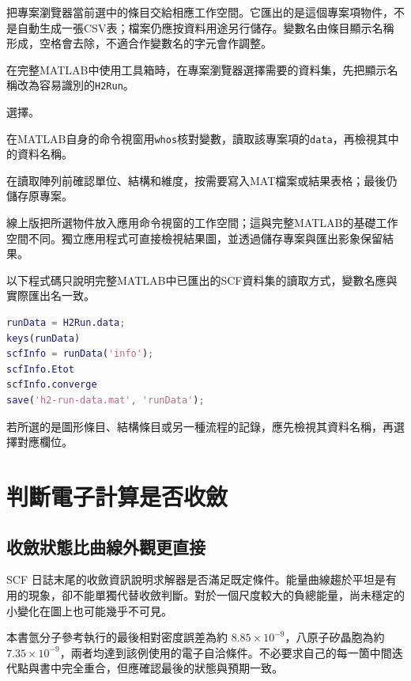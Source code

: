 把專案瀏覽器當前選中的條目交給相應工作空間。它匯出的是這個專案項物件，不是自動生成一張CSV表；檔案仍應按資料用途另行儲存。變數名由條目顯示名稱形成，空格會去除，不適合作變數名的字元會作調整。

\begin{steps}
\item 在完整MATLAB\regmark{}中使用工具箱時，在專案瀏覽器選擇需要的資料集，先把顯示名稱改為容易識別的\texttt{H2Run}。
\item 選擇。
\item 在MATLAB\regmark{}自身的命令視窗用\texttt{whos}核對變數，讀取該專案項的\texttt{data}，再檢視其中的資料名稱。
\item 在讀取陣列前確認單位、結構和維度，按需要寫入MAT檔案或結果表格；最後仍儲存原專案。
\end{steps}

線上版把所選物件放入應用命令視窗的工作空間；這與完整MATLAB\regmark{}的基礎工作空間不同。獨立應用程式可直接檢視結果圖，並透過儲存專案與匯出影象保留結果。

以下程式碼只說明完整MATLAB\regmark{}中已匯出的SCF資料集的讀取方式，變數名應與實際匯出名一致。

\begin{lstlisting}[language=Matlab]
runData = H2Run.data;
keys(runData)
scfInfo = runData('info');
scfInfo.Etot
scfInfo.converge
save('h2-run-data.mat', 'runData');
\end{lstlisting}

若所選的是圖形條目、結構條目或另一種流程的記錄，應先檢視其資料名稱，再選擇對應欄位。


\section{判斷電子計算是否收斂}

\subsection{收斂狀態比曲線外觀更直接}

SCF 日誌末尾的收斂資訊說明求解器是否滿足既定條件。能量曲線趨於平坦是有用的現象，卻不能單獨代替收斂判斷。對於一個尺度較大的負總能量，尚未穩定的小變化在圖上也可能幾乎不可見。

本書氫分子參考執行的最後相對密度誤差為約 $8.85\times10^{-9}$，八原子矽晶胞為約 $7.35\times10^{-9}$，兩者均達到該例使用的電子自洽條件。不必要求自己的每一箇中間迭代點與書中完全重合，但應確認最後的狀態與預期一致。

